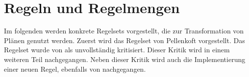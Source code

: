 \chapter{Regeln und Regelmengen}

Im folgenden werden konkrete Regelsets vorgestellt, die zur Transformation von Plänen genutzt werden. Zuerst wird das Regelset von Pellenkoft vorgestellt. Das Regelset wurde von \cite{indien} als unvollständig kritisiert. Dieser Kritik wird in einem weiteren Teil nachgegangen. Neben dieser Kritik wird auch die Implementierung einer neuen Regel, ebenfalls von \cite{indien} nachgegangen. 



